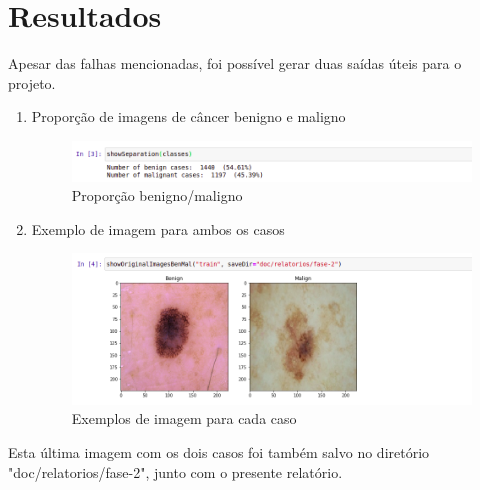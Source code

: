\documentclass[12pt,oneside,a4paper]{article}
\begin{document}
\section{Resultados}

Apesar das falhas mencionadas, foi possível gerar duas saídas úteis para o projeto.

\begin{enumerate}
    \item Proporção de imagens de câncer benigno e maligno
    \begin{figure}[h!]
        \centering
        \includegraphics[width=15cm]{notebook-fase-2-show-separation.png}
        \caption{Proporção benigno/maligno}
        \label{fig:my_label}
    \end{figure}
    
    \item Exemplo de imagem para ambos os casos
    \begin{figure}[h!]
        \centering
        \includegraphics[width=15cm]{notebook-fase-2-show-ben-mal.png}
        \caption{Exemplos de imagem para cada caso}
        \label{fig:my_label}
    \end{figure}
\end{enumerate}

Esta última imagem com os dois casos foi também salvo no diretório "doc/relatorios/fase-2", junto com o presente relatório.

\clearpage
\end{document}
